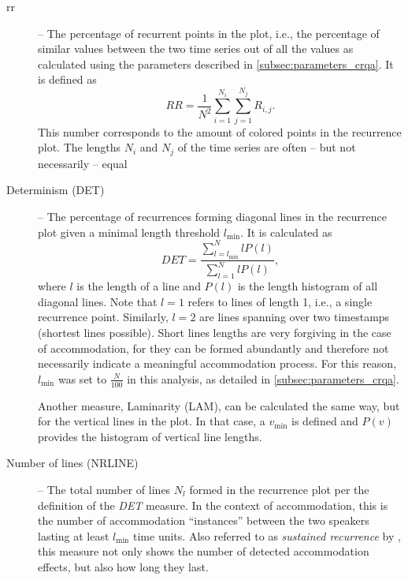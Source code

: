 \begin{description}
	\item[\Acf{rr}] -- The percentage of recurrent points in the plot, i.e., the percentage of similar values between the two time series out of all the values as calculated using the parameters described in \cref{subsec:parameters_crqa}.
	It is defined as
	\begin{equation}
		\label{eq:rr}
		RR = \frac{1}{N^2} \sum_{i=1}^{N_i} \sum_{j=1}^{N_j} R_{i,j}.
	\end{equation}
	This number corresponds to the amount of colored points in the recurrence plot.
	The lengths $N_i$ and $N_j$ of the time series are often -- but not necessarily -- equal
	
	\item[Determinism (DET)] -- The percentage of recurrences forming diagonal lines in the recurrence plot given a minimal length threshold $l_{\min}$.
	It is calculated as
	\begin{equation}
		\label{eq:det}
		DET = \frac{\sum_{l=l_{\min}}^{N} l P(l)}{\sum_{l=1}^N l P(l)},
	\end{equation}
	where $l$ is the length of a line and $P(l)$ is the length histogram of all diagonal lines.
	Note that $l=1$ refers to lines of length 1, i.e., a single recurrence point.	
	Similarly, $l=2$ are lines spanning over two timestamps (shortest lines possible).
	Short lines lengths are very forgiving in the case of accommodation, for they can be formed abundantly and therefore not necessarily indicate a meaningful accommodation process.
	For this reason, $l_{\min}$ was set to $\frac{N}{100}$ in this analysis, as detailed in \cref{subsec:parameters_crqa}.
	
	Another measure, Laminarity (LAM), can be calculated the same way, but for the vertical lines in the plot.
	In that case, a $v_{\min}$ is defined and $P(v)$ provides the histogram of vertical line lengths.
	
	\item[Number of lines (NRLINE)] -- The total number of lines $N_l$ formed in the recurrence plot per the definition of the \emph{DET} measure.
	In the context of accommodation, this is the number of accommodation \enquote{instances} between the two speakers lasting at least $l_{\min}$ time units.
	Also referred to as \emph{sustained recurrence} by \citet{Borrie2019syncing}, this measure not only shows the number of detected accommodation effects, but also how long they last.
	

\end{description}

